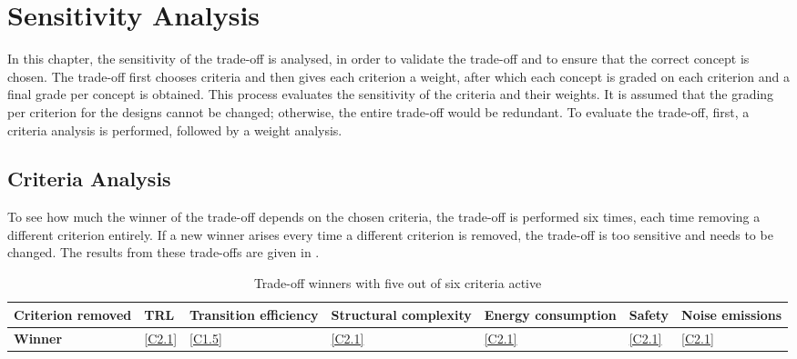 \chapter{Sensitivity Analysis}
\label{ch:SensitivityAnalysis}
In this chapter, the sensitivity of the trade-off is analysed, in order to validate the trade-off and to ensure that the correct concept is chosen.
The trade-off first chooses criteria and then gives each criterion a weight, after which each concept is graded on each criterion and a final grade per concept is obtained.
This process evaluates the sensitivity of the criteria and their weights.
It is assumed that the grading per criterion for the designs cannot be changed; otherwise, the entire trade-off would be redundant.
To evaluate the trade-off, first, a criteria analysis is performed, followed by a weight analysis.

\section{Criteria Analysis}
\label{sec:WeightChangeSensitivity}
To see how much the winner of the trade-off depends on the chosen criteria, the trade-off is performed six times, each time removing a different criterion entirely.
If a new winner arises every time a different criterion is removed, the trade-off is too sensitive and needs to be changed.
The results from these trade-offs are given in .

\begin{table}[ht]
    \centering
    \caption{Trade-off winners with five out of six criteria active}
    \label{tab:critremove}
    \begin{tabular}{l|m{1cm}m{1.8cm}m{2cm}m{1.8cm}m{1cm}m{1.7cm}}
        \toprule
        \textbf{Criterion removed}&  TRL &  Transition efficiency &  Structural complexity &  Energy consumption &  Safety & Noise emissions \\ \midrule
        \textbf{Winner}&  \ref{C2.1} &  \ref{C1.5} &  \ref{C2.1} &  \ref{C2.1} &  \ref{C2.1} & \ref{C2.1} \\ \bottomrule
    \end{tabular}
\end{table}

